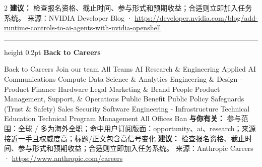 \documentclass[10.5pt]{ctexart}
\begin{document}
\begin{multicols}{2}
\textbf{建议：} 检查报名资格、截止时间、参与形式和预期收益；合适则立即加入任务系统。
{\footnotesize\color{ormuted} 来源：NVIDIA Developer Blog · \url{https://developer.nvidia.com/blog/add-runtime-controls-to-ai-agents-with-nvidia-openshell}}
\vspace{2mm}
\hrule height 0.2pt
\vspace{2mm}
{\large\bfseries Back to Careers}\par
Back to Careers Join our team All Teams AI Research \& Engineering Applied AI Communications Compute Data Science \& Analytics Engineering \& Design - Product Finance Hardware Legal Marketing \& Brand People Product Management, Support, \& Operations Public Benefit Public Policy Safeguards (Trust \& Safety) Sales Security Software Engineering - Infrastructure Technical Education Technical Program Management All Offices Ban
\textbf{与你有关：} 参与范围：全球 / 多为海外全职；命中用户订阅版面：opportunity、ai、research；来源接近一手且权威度高；标题/正文包含高信号变化
\textbf{建议：} 检查报名资格、截止时间、参与形式和预期收益；合适则立即加入任务系统。
{\footnotesize\color{ormuted} 来源：Anthropic Careers · \url{https://www.anthropic.com/careers}}
\end{multicols}
\end{document}
